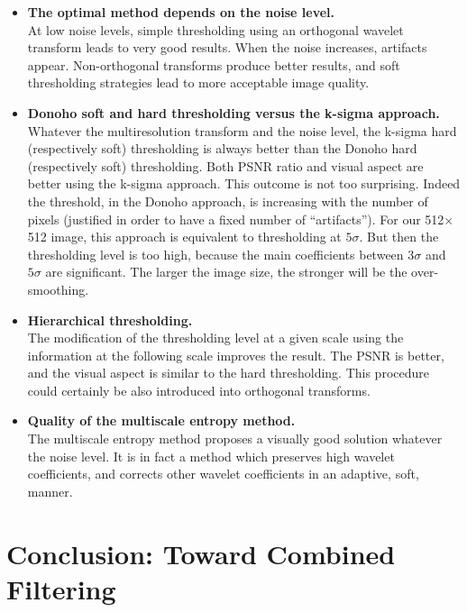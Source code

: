 \begin{itemize}
\item {\bf The optimal method depends on the noise level.} \\
At low noise levels, simple thresholding using an orthogonal wavelet
transform leads to very good results. When the noise increases, artifacts
appear.  Non-orthogonal transforms produce better results, and soft
thresholding strategies lead to more acceptable image quality.

\item {\bf Donoho soft and hard thresholding versus the k-sigma approach.} \\
Whatever the multiresolution transform and the noise level, 
the k-sigma hard (respectively soft)
 thresholding is always 
better than the Donoho hard (respectively soft) thresholding. Both PSNR ratio
and visual aspect are better using the k-sigma approach. This outcome is
not too surprising. Indeed the threshold, in the Donoho approach,
 is increasing with the number of 
pixels (justified in order to have a fixed number of ``artifacts'').
For our 512$\times$512 image, this approach is equivalent to thresholding 
at $5 \sigma$. But then the
thresholding level is too high, because the main coefficients between
$3\sigma$ and $5\sigma$ are significant. The larger the image size, 
the stronger will be the over-smoothing.

\item {\bf Hierarchical thresholding.} \\
The modification of the thresholding level at a given scale
 using the information at the following scale improves the result. 
The PSNR is better, and the visual aspect is similar to the hard thresholding.
This procedure could certainly be also introduced into orthogonal transforms.   
 
\item {\bf Quality of the multiscale entropy method.} \\
The multiscale entropy method proposes a visually good solution 
whatever the noise 
level. It is in fact a method which preserves high wavelet coefficients, and
corrects other wavelet coefficients in an adaptive, soft, manner.
\end{itemize}

\section{Conclusion: Toward Combined Filtering}


